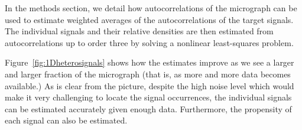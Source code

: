 \documentclass[english,11pt]{article}
\newcommand{\1}{\mathbf{1}}
\newcommand{\TODO}[1]{{\color{red}{[#1]}}}
\numberwithin{equation}{section}
\theoremstyle{plain}
\theoremstyle{definition}
\theoremstyle{remark}
\theoremstyle{plain}
\theoremstyle{remark}
\theoremstyle{plain}
\theoremstyle{plain}
\begin{document}
In the methods section, we detail how autocorrelations of the micrograph can be used to estimate weighted averages of the autocorrelations of the target signals. The individual signals and their relative densities are then estimated from autocorrelations up to order three by solving a nonlinear least-squares problem.

Figure~\ref{fig:1Dheterosignals} shows how the estimates improve as we see a larger and larger fraction of the micrograph (that is, as more and more data becomes available.) As is clear from the picture, despite the high noise level which would make it very challenging to locate the signal occurrences, the individual signals can be estimated accurately given enough data. Furthermore, the propensity of each signal can also be estimated.


%
%
\end{document}
